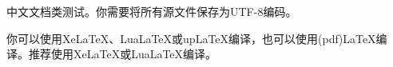 \documentclass[fontset=none, UTF8]{ctexart}
\begin{document}
中文文档类测试。你需要将所有源文件保存为UTF-8编码。

你可以使用XeLaTeX、LuaLaTeX或upLaTeX编译，也可以使用(pdf)LaTeX编译。推荐使用XeLaTeX或LuaLaTeX编译。
\end{document}
